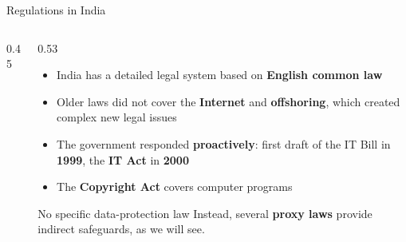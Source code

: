 \documentclass[aspectratio=169,11pt,xcolor={table}]{beamer}
\begin{document}
\begin{frame}{Regulations in India}
  \begin{columns}[c]
    \begin{column}{0.45\textwidth}
      \centering
    \end{column}
    \begin{column}{0.53\textwidth}
      \begin{itemize}\small\setlength{\itemsep}{4pt}
        \item India has a detailed legal system based on \textbf{English common law}
        \item Older laws did not cover the \textbf{Internet} and \textbf{offshoring}, which created complex new legal issues
        \item The government responded \textbf{proactively}: first draft of the IT Bill in \textbf{1999}, the \textbf{IT Act} in \textbf{2000}
        \item The \textbf{Copyright Act} covers computer programs
      \end{itemize}
      \begin{alertblock}{No specific data-protection law}
        \small Instead, several \textbf{proxy laws} provide indirect safeguards, as we will see.
      \end{alertblock}
    \end{column}
  \end{columns}
\end{frame}
\end{document}
